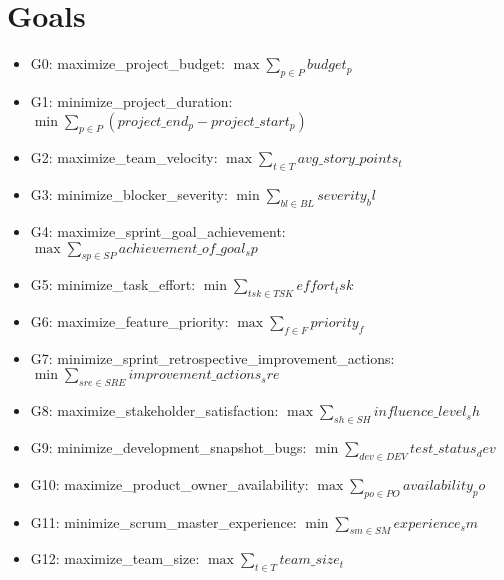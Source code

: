 \documentclass{article}
\begin{document}
\section{Goals}
\begin{itemize}
    \item G0: maximize\_project\_budget: $\max \sum_{p \in P} budget_p$
    \item G1: minimize\_project\_duration: $\min \sum_{p \in P} (project\_end_p - project\_start_p)$
    \item G2: maximize\_team\_velocity: $\max \sum_{t \in T} avg\_story\_points_t$
    \item G3: minimize\_blocker\_severity: $\min \sum_{bl \in BL} severity_bl$
    \item G4: maximize\_sprint\_goal\_achievement: $\max \sum_{sp \in SP} achievement\_of\_goal_sp$
    \item G5: minimize\_task\_effort: $\min \sum_{tsk \in TSK} effort_tsk$
    \item G6: maximize\_feature\_priority: $\max \sum_{f \in F} priority_f$
    \item G7: minimize\_sprint\_retrospective\_improvement\_actions: $\min \sum_{sre \in SRE} improvement\_actions_sre$
    \item G8: maximize\_stakeholder\_satisfaction: $\max \sum_{sh \in SH} influence\_level_sh$
    \item G9: minimize\_development\_snapshot\_bugs: $\min \sum_{dev \in DEV} test\_status_dev$
    \item G10: maximize\_product\_owner\_availability: $\max \sum_{po \in PO} availability_po$
    \item G11: minimize\_scrum\_master\_experience: $\min \sum_{sm \in SM} experience_sm$
    \item G12: maximize\_team\_size: $\max \sum_{t \in T} team\_size_t$
\end{itemize}
\end{document}

